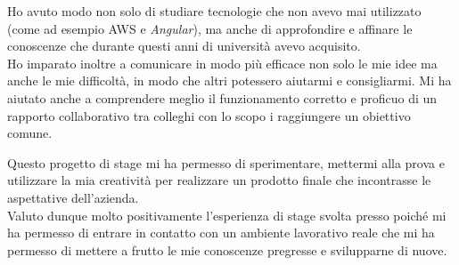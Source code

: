 \noindent Ho avuto modo non solo di studiare tecnologie che non avevo mai utilizzato (come ad esempio \gls{AWS} e \emph{Angular}), ma anche di approfondire e affinare le conoscenze che durante questi anni di università avevo acquisito.\\

\noindent Ho imparato inoltre a comunicare in modo più efficace non solo le mie idee ma anche le mie difficoltà, in modo che altri potessero aiutarmi e consigliarmi. Mi ha aiutato anche a comprendere meglio il funzionamento corretto e proficuo di un rapporto collaborativo tra colleghi con lo scopo i raggiungere un obiettivo comune.

\noindent Questo progetto di stage mi ha permesso di sperimentare, mettermi alla prova e utilizzare la mia creatività per 
realizzare un prodotto finale che incontrasse le aspettative dell'azienda. \\

\noindent Valuto dunque molto positivamente l'esperienza di stage svolta presso \azienda poiché mi ha permesso di entrare in contatto con un ambiente lavorativo reale che mi ha permesso di mettere a frutto le mie conoscenze pregresse e svilupparne di nuove.
